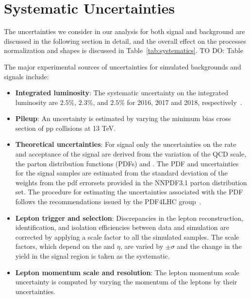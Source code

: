 \chapter{Systematic Uncertainties}
\label{ch:sys_unc}

The uncertainties we consider in our analysis for both signal and background are discussed in the following section in detail, 
and the overall effect on the processes normalization and shapes is discussed in Table~\ref{tab:systematics}. {\color{red} TO DO: Table} 

The major experimental sources of uncertainties for simulated backgrounds and signals include:
\begin{itemize}

  \item {\bf Integrated luminosity}: The systematic uncertainty on the integrated luminosity are $2.5\%$, $2.3\%$, and $2.5\%$ for 2016, 2017 and 2018, respectively~\cite{CMS-PAS-LUM-17-001,CMS-PAS-LUM-17-004,CMS-PAS-LUM-18-002}.

  \item {\bf Pileup}: An uncertainty is estimated by varying the minimum bias cross section of pp collisions at 13 TeV.

  \item {\bf Theoretical uncertainties}: For signal only the uncertainties on the rate and acceptance of the signal are derived from the variation of the QCD scale, the parton distribution functions (PDFs) and \alpS.
  The PDF and \alpS uncertainties for the \MADGRAPH signal samples are estimated from the standard deviation of the weights from the pdf errorsets provided in the NNPDF3.1 parton distribution set.
  The procedure for estimating the uncertainties associated with the PDF follows the recommendations issued by the PDF4LHC group~\cite{PDF4LHC}.

  \item {\bf Lepton trigger and selection}: Discrepancies in the lepton reconstruction, identification, and isolation efficiencies between data and simulation are corrected by applying a scale factor to all the simulated samples.
The scale factors, which depend on the \pt and $\eta$, are varied by $\pm \sigma$ and the change in the yield in the signal region is taken as the systematic. 

  \item {\bf Lepton momentum scale and resolution}: The lepton momentum scale uncertainty is computed by varying the momentum of the leptons by their uncertainties.


\end{itemize}
